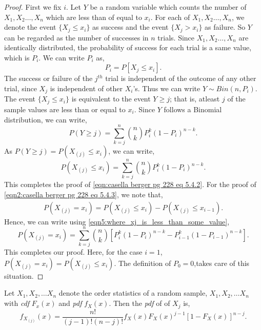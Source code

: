 \documentclass[a4paper,english,12pt]{article}
\begin{document}
\begin{proof}
First we fix $i$. Let $Y$ be a random variable which counts the number of $X_1,X_2 \ldots,X_n$ which are less than of equal to $x_i$. For each of $X_1,X_2 \ldots,X_n$, we denote the event $\{X_j \leq x_i\}$ as success and the event $\{X_j>x_i\}$ as failure. So $Y$ can be regarded as the number of successes in $n$ trials. Since $X_1,X_2 \ldots,X_n$  are identically distributed, the probability of success for each trial is a same value, which is $P_i$. We can write $P_i$ as,
\begin{equation}
P_i=P[X_j \leq x_i].
\end{equation}
The success or failure of the $j^{th}$ trial is independent of the outcome of any other trial, since $X_j$ is independent of other $X_{i}$'s. Thus we can write $Y \sim Bin(n,P_i)$. \\
The event $\{X_j \leq x_i\}$ is equivalent to the event ${Y \geq j}$; that is, atleast $j$ of the sample values are less than or equal to $x_i$. Since $Y$ follows a Binomial distribution, we can write,
\begin{equation} \label{eq4:eqn_where_Y_is_more_than_some_value}
P(Y \geq j)={\sum\limits_{k=j}^n} \binom{n}{k} P_i ^{k} (1-P_i)^{n-k}.
\end{equation}
As $P(Y \geq j)=P(X_{(j)} \leq x_i)$, we can write,
\begin{equation} \label{eqn5:where_xj_is_less_than_some_value}
P(X_{(j)} \leq x_i)={\sum\limits_{k=j}^n} \binom{n}{k} P_i ^{k} (1-P_i)^{n-k}.
\end{equation}
This completes the proof of \eqref{eqn:casella berger pg 228 eq 5.4.2}. For the proof of \eqref{eqn2:casella berger pg 228 eq 5.4.3}, we note that, 
\begin{align}
P(X_{(j)} = x_i)= P(X_{(j)} \leq x_i)-P(X_{(j)} \leq x_{i-1}). \nonumber
\end{align}
Hence, we can write using \eqref{eqn5:where_xj_is_less_than_some_value},
\begin{equation}
P(X_{(j)} = x_i)={\sum\limits_{k=j}^n} \binom{n}{k} [P_i ^{k} (1-P_i)^{n-k} - P_{i-1} ^{k} (1-P_{i-1})^{n-k}].
\end{equation}
This completes our proof. Here, for the case $i=1$, $P(X_{(j)} = x_i)=P(X_{(j)} \leq x_i)$. The definition of $P_0=0$,takes care of this situation.
\end{proof}
\begin{thm}
Let $X_{1},X_{2}, \dots X_{n}$ denote the order statistics of a random sample, $X_1,X_2, \dots X_n$ with {\it cdf} $F_x (x)$ and {\it pdf} $f_X (x)$. Then the {\it pdf} of of $X_j$ is,
\begin{equation}
f_{X_{(j)}} (x)= \frac{n!}{(j-1)!(n-j)!} f_X (x) F_X (x) ^{j-1} [1 - F_X (x)]^{n-j}.
\end{equation}
\end{thm}
\end{document}

